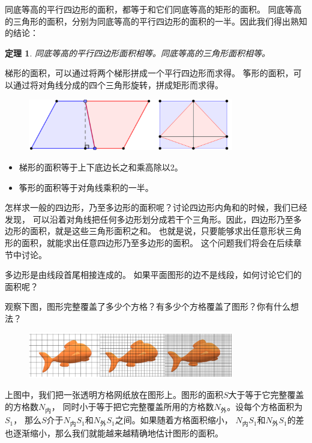 \documentclass[12pt,UTF8]{ctexbook}
\newtheorem{tm}{定理}[section]
\begin{document}
同底等高的平行四边形的面积，都等于和它们同底等高的矩形的面积。
同底等高的三角形的面积，分别为同底等高的平行四边形的面积的一半。因此我们得出熟知的结论：
\begin{tm}
    同底等高的平行四边形面积相等。同底等高的三角形面积相等。
\end{tm}

梯形的面积，可以通过将两个梯形拼成一个平行四边形而求得。
筝形的面积，可以通过将对角线分成的四个三角形旋转，拼成矩形而求得。

\begin{figure}[H] 
    \vspace{4pt}
    \centering
    \includegraphics[width=0.8\textwidth]{tu/面积_梯形1.png}
\end{figure}

\begin{itemize}
    \item 梯形的面积等于上下底边长之和乘高除以2。
    \item 筝形的面积等于对角线乘积的一半。
\end{itemize}

怎样求一般的四边形，乃至多边形的面积呢？讨论四边形内角和的时候，我们已经发现，
可以沿着对角线把任何多边形划分成若干个三角形。因此，四边形乃至多边形的面积，就是这些三角形面积之和。
也就是说，只要能够求出任意形状三角形的面积，就能求出任意四边形乃至多边形的面积。
这个问题我们将会在后续章节中讨论。

多边形是由线段首尾相接连成的。
如果平面图形的边不是线段，如何讨论它们的面积呢？

观察下图，图形完整覆盖了多少个方格？有多少个方格覆盖了图形？你有什么想法？

\begin{figure}[H] 
    \vspace{4pt}
    \centering
    \includegraphics[width=0.8\textwidth]{tu/面积_鱼1.png}
\end{figure}

上图中，我们把一张透明方格网纸放在图形上。图形的面积$S$大于等于它完整覆盖的方格数$N_{\text{内}}$，
同时小于等于把它完整覆盖所用的方格数$N_{\text{外}}$。设每个方格面积为$S_1$，
那么$S$介于$N_{\text{内}}S_1$和$N_{\text{外}}S_1$之间。如果随着方格面积缩小，
$N_{\text{内}}S_1$和$N_{\text{外}}S_1$的差也逐渐缩小，那么我们就能越来越精确地估计图形的面积。
\end{document}
